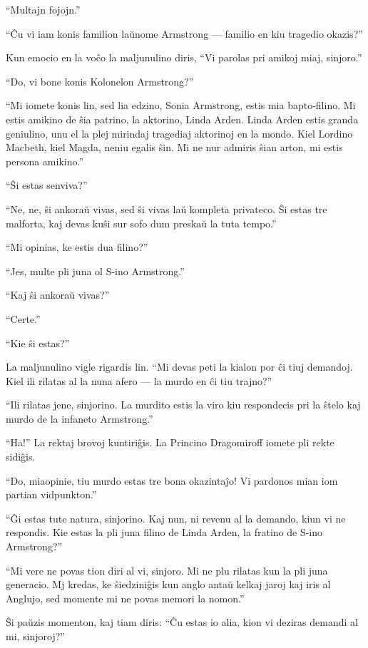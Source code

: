 ``Multajn fojojn.''

``Ĉu vi iam konis familion laŭnome Armstrong --- familio en kiu tragedio okazis?''

Kun emocio en la voĉo la maljunulino diris, ``Vi parolas pri amikoj miaj, sinjoro.''

``Do, vi bone konis Kolonelon Armstrong?''

``Mi iomete konis lin, sed lia edzino, Sonia Armstrong, estis mia bapto-filino. Mi estis amikino de ŝia patrino, la aktorino, Linda Arden. Linda Arden estis granda geniulino, unu el la plej mirindaj tragediaj aktorinoj en la mondo. Kiel Lordino Macbeth, kiel Magda, neniu egalis ŝin. Mi ne nur admiris ŝian arton, mi estis persona amikino.''

``Ŝi estas senviva?''

``Ne, ne, ŝi ankoraŭ vivas, sed ŝi vivas laŭ kompleta privateco. Ŝi estas tre malforta, kaj devas kuŝi sur sofo dum preskaŭ la tuta tempo.''

``Mi opinias, ke estis dua filino?''

``Jes, multe pli juna ol S-ino Armstrong.''

``Kaj ŝi ankoraŭ vivas?''

``Certe.''

``Kie ŝi estas?''

La maljunulino vigle rigardis lin. ``Mi devas peti la kialon por ĉi tiuj demandoj. Kiel ili rilatas al la nuna afero --- la murdo en ĉi tiu trajno?''

``Ili rilatas jene, sinjorino. La murdito estis la viro kiu respondecis pri la ŝtelo kaj murdo de la infaneto Armstrong.''

``Ha!'' La rektaj brovoj kuntiriĝis. La Princino Dragomiroff iomete pli rekte sidiĝis.

``Do, miaopinie, tiu murdo estas tre bona okazintaĵo! Vi pardonos mian iom partian vidpunkton.''

``Ĝi estas tute natura, sinjorino. Kaj nun, ni revenu al la demando, kiun vi ne respondis. Kie estas la pli juna filino de Linda Arden, la fratino de S-ino Armstrong?''

``Mi vere ne povas tion diri al vi, sinjoro. Mi ne plu rilatas kun la pli juna generacio. Mj kredas, ke ŝiedziniĝis kun anglo antaŭ kelkaj jaroj kaj iris al Anglujo, sed momente mi ne povas memori la nomon.''

Ŝi paŭzis momenton, kaj tiam diris: ``Ĉu estas io alia, kion vi deziras demandi al mi, sinjoroj?''

